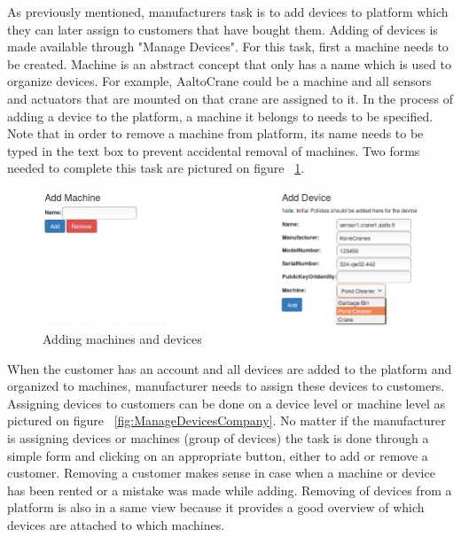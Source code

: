 As previously mentioned, manufacturers task is to add devices to platform which they can later assign to customers that have bought them. Adding of devices is made available through "Manage Devices". For this task, first a machine needs to be created. Machine is an abstract concept that only has a name which is used to organize devices. For example, AaltoCrane could be a machine and all sensors and actuators that are mounted on that crane are assigned to it. In the process of adding a device to the platform, a machine it belongs to needs to be specified. Note that in order to remove a machine from platform, its name needs to be typed in the text box to prevent accidental removal of machines. Two forms needed to complete this task are pictured on figure ~\ref{fig:AddMachineDevice}. 

\begin{figure}[ht]
	\begin{center}
		\includegraphics[width=\textwidth]{images/implementation/AddMachineDevice}
		\caption{Adding machines and devices}
		\label{fig:AddMachineDevice}
	\end{center}
\end{figure}

When the customer has an account and all devices are added to the platform and organized to machines, manufacturer needs to assign these devices to customers. Assigning devices to customers can be done on a device level or machine level as pictured on figure ~\ref{fig:ManageDevicesCompany}. No matter if the manufacturer is assigning devices or machines (group of devices) the task is done through a simple form and clicking on an appropriate button, either to add or remove a customer. Removing a customer makes sense in case when a machine or device has been rented or a mistake was made while adding. Removing of devices from a platform is also in a same view because it provides a good overview of which devices are attached to which machines.

